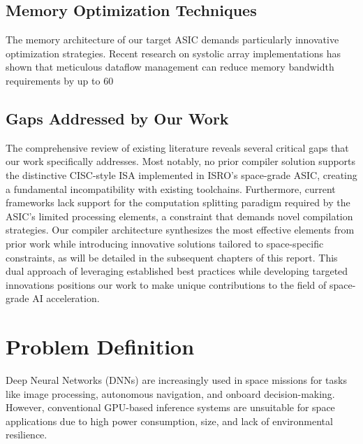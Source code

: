\documentclass[12pt]{report}
\begin{document}
\section{Memory Optimization Techniques}
The memory architecture of our target ASIC demands particularly innovative optimization strategies. Recent research on systolic array implementations \cite{systolic2021} has shown that meticulous dataflow management can reduce memory bandwidth requirements by up to 60%

\section{Gaps Addressed by Our Work}
The comprehensive review of existing literature reveals several critical gaps that our work specifically addresses. Most notably, no prior compiler solution supports the distinctive CISC-style ISA implemented in ISRO's space-grade ASIC, creating a fundamental incompatibility with existing toolchains. Furthermore, current frameworks lack support for the computation splitting paradigm required by the ASIC's limited processing elements, a constraint that demands novel compilation strategies. Our compiler architecture synthesizes the most effective elements from prior work while introducing innovative solutions tailored to space-specific constraints, as will be detailed in the subsequent chapters of this report. This dual approach of leveraging established best practices while developing targeted innovations positions our work to make unique contributions to the field of space-grade AI acceleration.
\chapter{Problem Definition}

Deep Neural Networks (DNNs) are increasingly used in space missions for tasks like image processing, autonomous navigation, and onboard decision-making. However, conventional GPU-based inference systems are unsuitable for space applications due to high power consumption, size, and lack of environmental resilience.
\end{document}
